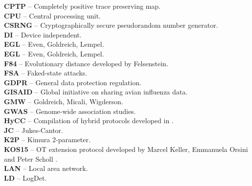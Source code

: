 \textbf{CPTP} -- Completely positive trace preserving map.
\vspace{0.5cm}\\
\textbf{CPU} -- Central processing unit.
\vspace{0.5cm}\\
\textbf{CSRNG} -- Cryptographically secure pseudorandom number generator.
\vspace{0.5cm}\\
\textbf{DI} -- Device independent.
\vspace{0.5cm}\\
\textbf{EGL} -- Even, Goldreich, Lempel.
\vspace{0.5cm}\\
\textbf{EGL} -- Even, Goldreich, Lempel.
\vspace{0.5cm}\\
\textbf{F84} -- Evolutionary distance developed by Felsenstein.
\vspace{0.5cm}\\
\textbf{FSA} -- Faked-state attacks.
\vspace{0.5cm}\\
\textbf{GDPR} -- General data protection regulation.
\vspace{0.5cm}\\
\textbf{GISAID} -- Global initiative on sharing avian influenza data.
\vspace{0.5cm}\\
\textbf{GMW} -- Goldreich, Micali, Wigderson.
\vspace{0.5cm}\\
\textbf{GWAS} -- Genome-wide association studies.
\vspace{0.5cm}\\
\textbf{HyCC} -- Compilation of hybrid protocols developed in \cite{Bscher2018}.
\vspace{0.5cm}\\
\textbf{JC} -- Jukes-Cantor.
\vspace{0.5cm}\\
\textbf{K2P} -- Kimura 2-parameter.
\vspace{0.5cm}\\
\textbf{KOS15} -- OT extension protocol developed by Marcel Keller, Emmanuela Orsini and Peter Scholl \cite{KOS15}.
\vspace{0.5cm}\\
\textbf{LAN} -- Local area network.
\vspace{0.5cm}\\
\textbf{LD} -- LogDet.
\vspace{0.5cm}\\
